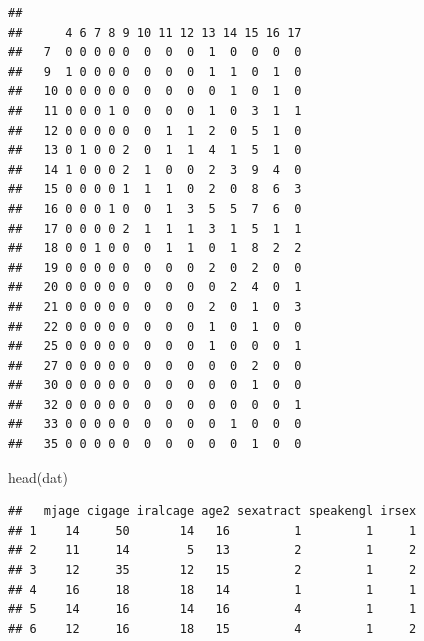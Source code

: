 \documentclass[
]{article}
\newenvironment{Shaded}{\begin{snugshade}}{\end{snugshade}}
\newcommand{\AttributeTok}[1]{\textcolor[rgb]{0.77,0.63,0.00}{#1}}
\newcommand{\CommentTok}[1]{\textcolor[rgb]{0.56,0.35,0.01}{\textit{#1}}}
\newcommand{\ConstantTok}[1]{\textcolor[rgb]{0.00,0.00,0.00}{#1}}
\newcommand{\FunctionTok}[1]{\textcolor[rgb]{0.00,0.00,0.00}{#1}}
\newcommand{\NormalTok}[1]{#1}
\newcommand{\OtherTok}[1]{\textcolor[rgb]{0.56,0.35,0.01}{#1}}
\newcommand{\SpecialCharTok}[1]{\textcolor[rgb]{0.00,0.00,0.00}{#1}}
\newcommand{\StringTok}[1]{\textcolor[rgb]{0.31,0.60,0.02}{#1}}
\begin{document}
\begin{verbatim}
##     
##      4 6 7 8 9 10 11 12 13 14 15 16 17
##   7  0 0 0 0 0  0  0  0  1  0  0  0  0
##   9  1 0 0 0 0  0  0  0  1  1  0  1  0
##   10 0 0 0 0 0  0  0  0  0  1  0  1  0
##   11 0 0 0 1 0  0  0  0  1  0  3  1  1
##   12 0 0 0 0 0  0  1  1  2  0  5  1  0
##   13 0 1 0 0 2  0  1  1  4  1  5  1  0
##   14 1 0 0 0 2  1  0  0  2  3  9  4  0
##   15 0 0 0 0 1  1  1  0  2  0  8  6  3
##   16 0 0 0 1 0  0  1  3  5  5  7  6  0
##   17 0 0 0 0 2  1  1  1  3  1  5  1  1
##   18 0 0 1 0 0  0  1  1  0  1  8  2  2
##   19 0 0 0 0 0  0  0  0  2  0  2  0  0
##   20 0 0 0 0 0  0  0  0  0  2  4  0  1
##   21 0 0 0 0 0  0  0  0  2  0  1  0  3
##   22 0 0 0 0 0  0  0  0  1  0  1  0  0
##   25 0 0 0 0 0  0  0  0  1  0  0  0  1
##   27 0 0 0 0 0  0  0  0  0  0  2  0  0
##   30 0 0 0 0 0  0  0  0  0  0  1  0  0
##   32 0 0 0 0 0  0  0  0  0  0  0  0  1
##   33 0 0 0 0 0  0  0  0  0  1  0  0  0
##   35 0 0 0 0 0  0  0  0  0  0  1  0  0
\end{verbatim}

\begin{Shaded}
\begin{Highlighting}[]
\FunctionTok{head}\NormalTok{(dat)}
\end{Highlighting}
\end{Shaded}

\begin{verbatim}
##   mjage cigage iralcage age2 sexatract speakengl irsex
## 1    14     50       14   16         1         1     1
## 2    11     14        5   13         2         1     2
## 3    12     35       12   15         2         1     2
## 4    16     18       18   14         1         1     1
## 5    14     16       14   16         4         1     1
## 6    12     16       18   15         4         1     2
\end{verbatim}

\begin{Shaded}
\end{Shaded}
\end{document}
